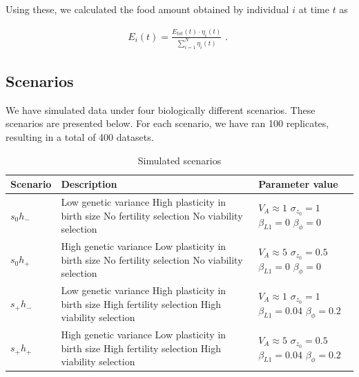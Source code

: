 Using these, we calculated the food amount obtained by individual $i$ at time $t$ as

\begin{align}
E_i (t) = \frac{E_{tot} (t) \cdot \eta_i (t)}{ \sum_{i=1}^{N} \eta_i (t)} \text{ . }
\end{align}

\clearpage
\subsection{Scenarios} \label{app:scenarios}
We have simulated data under four biologically different scenarios. These scenarios are presented below. For each scenario, we have ran 100 replicates, resulting in a total of 400 datasets.
\begin{table}[ht]
\centering
\caption{Simulated scenarios} 
\label{coeff}
\begin{tabularx}{\textwidth}{lXX}
  \hline
Scenario & Description & Parameter value \\ 
  \hline
$s_0h_-$ & Low genetic variance \newline High plasticity in birth size \newline No fertility selection \newline No viability selection & $V_A \approx 1$ \newline $\sigma_{z_0}=1$ \newline $\beta_{L1}=0$ \newline $\beta_{\phi}=0$  \\ \hline
$s_0h_+$ & High genetic variance \newline Low plasticity in birth size \newline No fertility selection \newline No viability selection& $V_A \approx 5$  \newline $\sigma_{z_0}=0.5$ \newline $\beta_{L1}=0$ \newline $\beta_{\phi}=0$ \\ \hline
$s_+h_-$ & Low genetic variance \newline High plasticity in birth size \newline High fertility selection \newline High viability selection& $V_A \approx 1$ \newline $\sigma_{z_0}=1$ \newline $\beta_{L1}=0.04$ \newline $\beta_{\phi}=0.2$ \\ \hline
$s_+h_+$ & High genetic variance \newline Low plasticity in birth size \newline High fertility selection \newline High viability selection& $V_A \approx 5$  \newline $\sigma_{z_0}=0.5$ \newline $\beta_{L1}=0.04$ \newline $\beta_{\phi}=0.2$ \\ 
  \hline
\end{tabularx}
\end{table}

